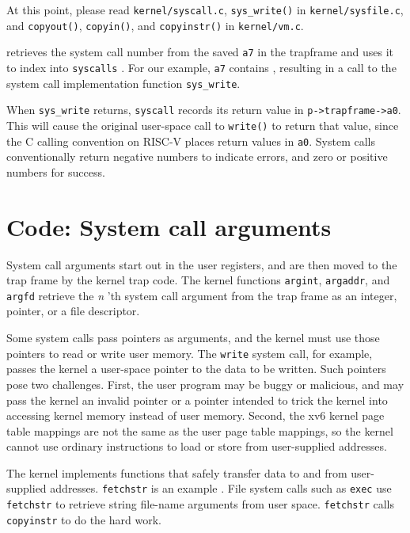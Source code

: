 At this point, please read {\tt kernel/syscall.c},
{\tt sys\_write()} in {\tt kernel/sysfile.c},
and {\tt copyout()}, {\tt copyin()}, and {\tt copyinstr()} in {\tt kernel/vm.c}.

retrieves the system call number from the saved
\texttt{a7} in the trapframe
and uses it to index into {\tt syscalls}
.
For our example, 
\texttt{a7}
contains 
,
resulting in a call to the system call implementation function
\lstinline{sys_write}.

When \lstinline{sys_write} returns,
\lstinline{syscall}
records its return value in
\lstinline{p->trapframe->a0}.
This will cause the original user-space call to 
{\tt write()} to return that value, since the C
calling convention on RISC-V places return values in {\tt a0}.
System calls conventionally return negative numbers to indicate
errors, and zero or positive numbers for success.

\section{Code: System call arguments}

System call arguments start out in the user registers, and
are then moved to the trap frame by the kernel trap code.
The kernel functions
\lstinline{argint},
\lstinline{argaddr},
and
\lstinline{argfd}
retrieve the 
\textit{n} 'th 
system call argument
from the trap frame
as an integer, pointer, or a file descriptor.

Some system calls pass pointers as arguments, and the kernel must use
those pointers to read or write user memory. The {\tt write} system
call, for example, passes the kernel a user-space pointer
to the data to be written.
Such pointers pose
two challenges. First, the user program may be buggy or malicious, and
may pass the kernel an invalid pointer or a pointer intended to trick
the kernel into accessing kernel memory instead of user memory.
Second, the xv6 kernel page table mappings are not the same as the
user page table mappings, so the kernel cannot use ordinary
instructions to load or store from user-supplied addresses.

The kernel implements functions that safely transfer data to and
from user-supplied addresses.
{\tt fetchstr} is an example .
File system calls such as
{\tt exec} use {\tt fetchstr} to retrieve string file-name arguments from user
space.
\lstinline{fetchstr} calls \lstinline{copyinstr}
to do the hard work.

